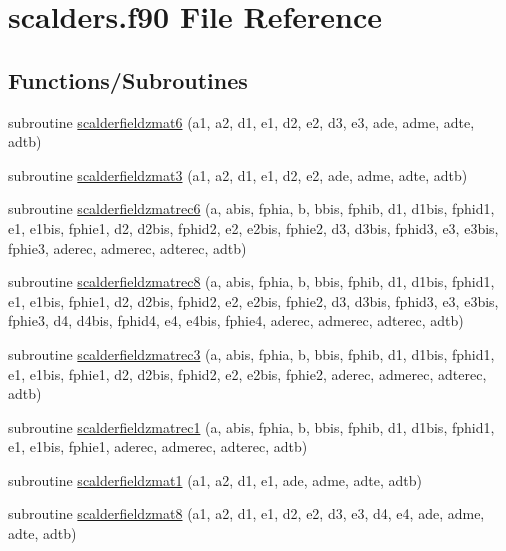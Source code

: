 \hypertarget{scalders_8f90}{\section{scalders.\-f90 File Reference}
\label{scalders_8f90}
}
\subsection*{Functions/\-Subroutines}
\begin{DoxyCompactItemize}
\item 
subroutine \hyperlink{scalders_8f90_a2ce7bff63b18a942f3260383a0479a64}{scalderfieldzmat6} (a1, a2, d1, e1, d2, e2, d3, e3, ade, adme, adte, adtb)
\item 
subroutine \hyperlink{scalders_8f90_a8f869c2eb469941c305e4a7e9ae1022f}{scalderfieldzmat3} (a1, a2, d1, e1, d2, e2, ade, adme, adte, adtb)
\item 
subroutine \hyperlink{scalders_8f90_ac30348550dc87577f2ac03d074633947}{scalderfieldzmatrec6} (a, abis, fphia, b, bbis, fphib, d1, d1bis, fphid1, e1, e1bis, fphie1, d2, d2bis, fphid2, e2, e2bis, fphie2, d3, d3bis, fphid3, e3, e3bis, fphie3, aderec, admerec, adterec, adtb)
\item 
subroutine \hyperlink{scalders_8f90_a8a17b1ec1d964cb09371f5c3e7ccb362}{scalderfieldzmatrec8} (a, abis, fphia, b, bbis, fphib, d1, d1bis, fphid1, e1, e1bis, fphie1, d2, d2bis, fphid2, e2, e2bis, fphie2, d3, d3bis, fphid3, e3, e3bis, fphie3, d4, d4bis, fphid4, e4, e4bis, fphie4, aderec, admerec, adterec, adtb)
\item 
subroutine \hyperlink{scalders_8f90_a977cf40e1afa0827381bdea03797b68e}{scalderfieldzmatrec3} (a, abis, fphia, b, bbis, fphib, d1, d1bis, fphid1, e1, e1bis, fphie1, d2, d2bis, fphid2, e2, e2bis, fphie2, aderec, admerec, adterec, adtb)
\item 
subroutine \hyperlink{scalders_8f90_a7fb93afb05d26cc86a8a534b1cfba800}{scalderfieldzmatrec1} (a, abis, fphia, b, bbis, fphib, d1, d1bis, fphid1, e1, e1bis, fphie1, aderec, admerec, adterec, adtb)
\item 
subroutine \hyperlink{scalders_8f90_a290379d65727f406e20df8c9d7dbd5b8}{scalderfieldzmat1} (a1, a2, d1, e1, ade, adme, adte, adtb)
\item 
subroutine \hyperlink{scalders_8f90_a561c8792a0f925c93e337110eb49bce9}{scalderfieldzmat8} (a1, a2, d1, e1, d2, e2, d3, e3, d4, e4, ade, adme, adte, adtb)
\end{DoxyCompactItemize}


